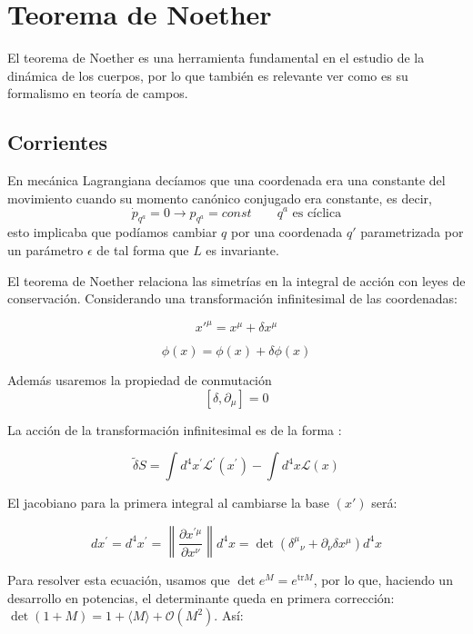 \section{Teorema de Noether}

El teorema de Noether es una herramienta fundamental en el estudio de la dinámica de los cuerpos, por lo que también es relevante ver como es su formalismo en teoría de campos.
\subsection{Corrientes}
En mecánica Lagrangiana decíamos que una coordenada era una constante del movimiento cuando su momento canónico conjugado era constante, es decir,
$$\dot{p}_{q^a}=0\rightarrow p_{q^a}=const \qquad q^a \text{ es cíclica}$$
esto implicaba que podíamos cambiar $q$ por una coordenada $q'$ parametrizada por un parámetro $\epsilon$ de tal forma que $L$ es invariante. 

El teorema de Noether relaciona las simetrías en la integral de acción con leyes de conservación. Considerando una transformación infinitesimal de las coordenadas:

$$
x'^\mu = x^\mu + \delta x^\mu
$$

$$
\phi(x) = \phi(x) + \delta \phi(x)
$$

Además usaremos la propiedad de conmutación
$$
 \left[ \delta, \partial_\mu \right] = 0
$$

La acción de la transformación infinitesimal es de la forma :

\begin{equation}
\tilde{\delta} S=\int d^4 x^{\prime} \mathcal{L}^{\prime}\left(x^{\prime}\right)-\int d^4 x \mathcal{L}(x)
\end{equation}

El jacobiano para la primera integral al cambiarse la base $(x')$ será:

\begin{equation}
d x^{\prime}=d^4 x^{\prime}=\left\|\frac{\partial x^{\prime \mu}}{\partial x^\nu}\right\| d^4 x=\operatorname{det}\left(\delta^\mu{ }_\nu+\partial_\nu \delta x^\mu\right) d^4 x
\end{equation}

Para resolver esta ecuación, usamos que $\det{e^M} = e^{\text{tr}M}$, por lo que, haciendo un desarrollo en potencias, el determinante queda en primera corrección: $\det(1+M) = 1+\langle M \rangle +\mathcal{O}(M^2)$. Así:

